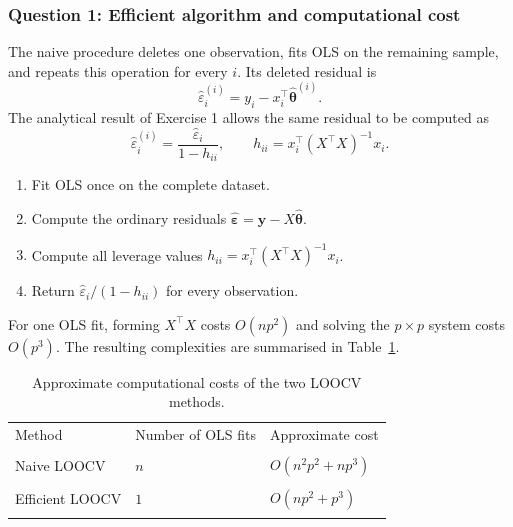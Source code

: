 \documentclass[11pt,a4paper]{article}
\newcommand{\thetahat}{\widehat{\bm\theta}}
\newcommand{\epshat}{\widehat{\bm\varepsilon}}
\begin{document}
\subsubsection{Question 1: Efficient algorithm and computational cost}
The naive procedure deletes one observation, fits OLS on the remaining sample,
and repeats this operation for every $i$. Its deleted residual is
\[
    \widehat\varepsilon_i^{(i)}
    =y_i-x_i^\top\widehat{\bm\theta}^{(i)}.
\]
The analytical result of Exercise 1 allows the same residual to be computed as
\[
    \widehat\varepsilon_i^{(i)}
    =\frac{\widehat\varepsilon_i}{1-h_{ii}},
    \qquad
    h_{ii}=x_i^\top(X^\top X)^{-1}x_i.
\]
\begin{methodbox}
\begin{enumerate}
    \item Fit OLS once on the complete dataset.
    \item Compute the ordinary residuals
          $\epshat=\bm y-X\thetahat$.
    \item Compute all leverage values
          $h_{ii}=x_i^\top(X^\top X)^{-1}x_i$.
    \item Return $\widehat\varepsilon_i/(1-h_{ii})$ for every observation.
\end{enumerate}
\end{methodbox}
For one OLS fit, forming $X^\top X$ costs $O(np^2)$ and solving the
$p\times p$ system costs $O(p^3)$. The resulting complexities are summarised
in Table~\ref{tab:complexity}.
\begin{table}[H]
    \centering
    \caption{Approximate computational costs of the two LOOCV methods.}
    \label{tab:complexity}
    \renewcommand{\arraystretch}{1.2}
    \begin{tabular}{lll}
        \toprule
        Method & Number of OLS fits & Approximate cost \\\\
        \midrule
        Naive LOOCV & $n$ & $O(n^2p^2+np^3)$ \\\\
        Efficient LOOCV & $1$ & $O(np^2+p^3)$ \\\\
        \bottomrule
    \end{tabular}
\end{table}
\end{document}

